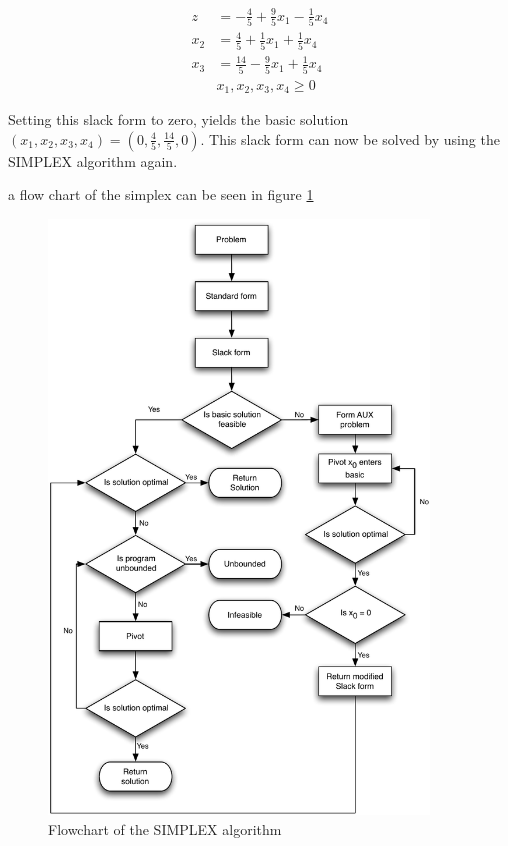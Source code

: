 \documentclass[10pt]{article}
\begin{document}
\begin{align}
    z &= - \frac{4}{5} + \frac{9}{5} x_1 - \frac{1}{5} x_4\\ 
  x_2 &= \frac{4}{5} + \frac{1}{5} x_1 + \frac{1}{5} x_4    \nonumber\\
  x_3 &= \frac{14}{5} - \frac{9}{5} x_1 + \frac{1}{5} x_4    \nonumber\\
  &x_1, x_2, x_3, x_4    \geq 0 \nonumber 
\end{align}

Setting this slack form to zero, yields the basic solution $(x_1, x_2, x_3, x_4) = (0, \frac{4}{5} , \frac{14}{5} , 0)$. This slack form can now be solved by using the SIMPLEX algorithm again.

a flow chart of the simplex can be seen in figure \ref{fig4}

\begin{figure}[ht]
\centering
\includegraphics[width=0.9\textwidth]{figures/fig4.pdf}
\caption{Flowchart of the SIMPLEX algorithm}
\label{fig4}
\end{figure}
\end{document}
